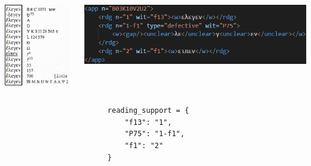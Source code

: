 \documentclass[10pt]{beamer}
\begin{document}
	\begin{frame}[fragile]
		\begin{columns}
			\begin{column}{0.25\textwidth}
				\includegraphics[width=\textwidth]{../img/swanson-luke-10-2-2.png}
			\end{column}
			\begin{column}{0.65\textwidth}
				\includegraphics[width=\textwidth]{../img/app-xml.png}
			\end{column}
		\end{columns}
		\begin{center}
\begin{verbatim}
                        reading_support = {
                            "f13": "1",
                            "P75": "1-f1",
                            "f1": "2"
                        }
\end{verbatim}
		\end{center}
	\end{frame}
\end{document}
